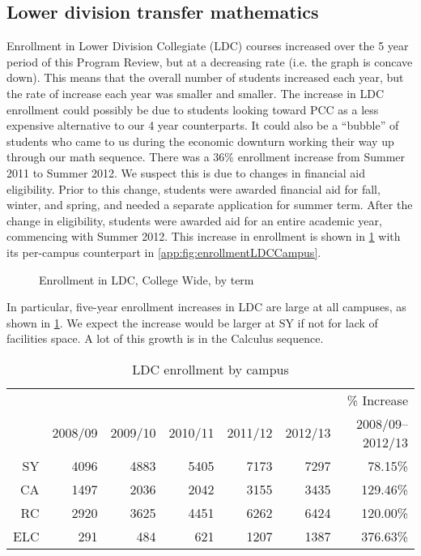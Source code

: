 \subsection{Lower division transfer mathematics}
Enrollment in Lower Division Collegiate (LDC) courses increased over the 5 year period of this Program Review, but at a decreasing rate (i.e.
the graph is
concave down).
This means that the overall number of students increased each year, but the rate of increase each year was smaller and smaller.
The increase in LDC enrollment could possibly be due to students looking toward PCC as a less expensive alternative to our 4 year counterparts.
It could also be a ``bubble'' of students who came to us during the economic downturn working their way up through our math sequence.
There was a 36\% enrollment increase from Summer 2011 to Summer 2012.
We suspect this is due to changes in financial aid eligibility.
Prior to this change, students were awarded financial aid for fall, winter, and spring, and needed a separate application for summer term.
After the change in eligibility, students were awarded aid for an entire academic year, commencing with Summer 2012.
This increase in enrollment is shown in \cref{needs:fig:enrollmentLDCTerm} with its per-campus counterpart in \vref{app:fig:enrollmentLDCCampus}.

\begin{figure}[!htb]
	\centering
	
	\caption{Enrollment in LDC, College Wide, by term}
	\label{needs:fig:enrollmentLDCTerm}
\end{figure}

In particular, five-year enrollment increases  in LDC are large at all campuses, as shown in \cref{needs:tab:LDCenrollmentCampus}.
We expect the increase would be larger at SY if not for lack of facilities space.
A lot of this growth is in the Calculus sequence.

\begin{table}[!htb]
	\centering
	\caption{LDC enrollment by campus}
	\label{needs:tab:LDCenrollmentCampus}
	\begin{tabular}{r*{6}{r}}
		\toprule
		    &         &         &         &         &         & \% Increase      \\
		    & 2008/09 & 2009/10 & 2010/11 & 2011/12 & 2012/13 & 2008/09--2012/13 \\
		\midrule
		SY  & 4096    & 4883    & 5405    & 7173    & 7297    & 78.15\%          \\
		CA  & 1497    & 2036    & 2042    & 3155    & 3435    & 129.46\%         \\
		RC  & 2920    & 3625    & 4451    & 6262    & 6424    & 120.00\%         \\
		ELC & 291     & 484     & 621     & 1207    & 1387    & 376.63\%         \\
		\bottomrule
	\end{tabular}
\end{table}

